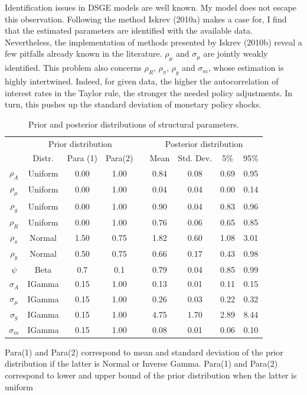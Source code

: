 \documentclass[a4paper]{article}
\begin{document}
Identification issues in DSGE models are well known. My model does not escape this observation. Following the method Iskrev (2010a) makes a case for, I find that the estimated parameters are identified with the available data. Nevertheless, the implementation of methods presented by Iskrev (2010b) reveal a few pitfalls already known in the literature. $\rho_\mu$ and $\sigma_{\mu}$ are jointly weakly identified. This problem also concerns $\rho_R$, $\rho_{\pi}$, $\rho_y$ and $\sigma_m$, whose estimation is highly intertwined. Indeed, for given data, the higher the autocorrelation of interest rates in the Taylor rule, the stronger the needed policy adjustments. In turn, this pushes up the standard deviation of monetary policy shocks.

\begin{table}[H]
  \centering
  \caption{Prior and posterior distributions of structural parameters.}
    \begin{tabular}{ccccccccc}
    \toprule
    \toprule
          & \multicolumn{3}{c}{ Prior distribution } &       & \multicolumn{4}{c}{ Posterior distribution } \\
    \cmidrule{2-4} \cmidrule{6-9}
          & Distr. & Para (1) & Para(2) &       & Mean  & Std. Dev. & 5\%   & 95\% \\
          \toprule
    $\rho_A$ & Uniform & 0.00  & 1.00  &       & 0.84  & 0.08  & 0.69  & 0.95 \\
    $\rho_\mu$ & Uniform & 0.00  & 1.00  &       & 0.04  & 0.04  & 0.00  & 0.14 \\
    $\rho_g$ & Uniform & 0.00  & 1.00  &       & 0.90  & 0.04  & 0.83  & 0.96 \\
    $\rho_R$ & Uniform & 0.00  & 1.00  &       & 0.76  & 0.06  & 0.65  & 0.85 \\
    $\rho_\pi$ & Normal & 1.50  & 0.75  &       & 1.82  & 0.60  & 1.08  & 3.01 \\
    $\rho_y$ & Normal & 0.50  & 0.75  &       & 0.66  & 0.17  & 0.43  & 0.98 \\
    $\psi$ & Beta & 0.7  & 0.1  &       & 0.79  & 0.04  & 0.85  & 0.99 \\
    $\sigma_A$ & IGamma & 0.15  & 1.00  &       & 0.13  & 0.01  & 0.11  & 0.15 \\
    $\sigma_\mu$ & IGamma & 0.15  & 1.00  &       & 0.26  & 0.03  & 0.22  & 0.32 \\
    $\sigma_g$ & IGamma & 0.15  & 1.00  &       & 4.75  & 1.70  & 2.89  & 8.44 \\
    $\sigma_m$ & IGamma & 0.15  & 1.00  &       & 0.08  & 0.01  & 0.06  & 0.10 \\
    \bottomrule
    \end{tabular}%
  \label{estimates}
  \begin{flushleft}
    \footnotesize{Para(1) and Para(2) correspond to mean and standard deviation of the prior distribution if the latter is Normal or Inverse Gamma. Para(1) and Para(2) correspond to lower and upper bound of the prior distribution when the latter is uniform}
\end{flushleft}

\end{table}%
\end{document}
